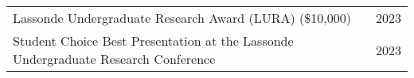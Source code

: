 
\begin{tabularx}{\textwidth}{@{}X r@{}}
    Lassonde Undergraduate Research Award (LURA) (\$10,000) & 2023 \\
    Student Choice Best Presentation at the Lassonde Undergraduate Research Conference & 2023 \\
\end{tabularx}
